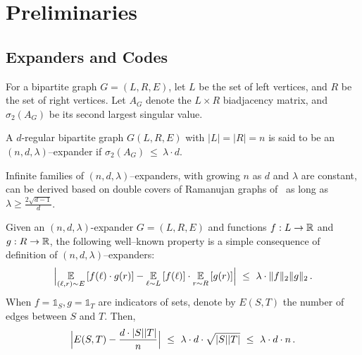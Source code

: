 \section{Preliminaries}\label{sec:prelims}


\subsection{Expanders and Codes}



%
%


For a bipartite graph $G=(L,R,E)$, let $L$ be the set of left vertices, and $R$ be the set of right vertices. Let $A_G$ denote the $L\times R$ biadjacency matrix, and $\sigma_2(A_G)$ be its second largest singular value.
 
 
\begin{definition}
A $d$-regular bipartite graph $G(L,R,E)$ with $|L|=|R|=n$ is said to be an $(n,d,\lambda)$--expander if $\sigma_2(A_G) ~\leq~ \lambda \cdot d$.
\end{definition}

Infinite families of $(n,d,\lambda)$--expanders, with growing $n$ as $d$ and $\lambda$ are constant, can be derived based on double covers of Ramanujan graphs of~\cite{LPS88} as long as $\lambda \geq \frac{2\sqrt{d-1}}{d}$.

\begin{lemma}\label{lem:eml}
	Given an $(n,d,\lambda)$-expander $G=(L,R,E)$ and functions $f: L \rightarrow {\mathbb R}$ and $g: R \rightarrow {\mathbb R}$, the following well--known property is a simple consequence of definition of $(n,d,\lambda)$--expanders:
	\[ \Big\vert{\Ex{(\li,\ri) \sim E}{ f(\li) \cdot g(\ri)} - \Ex{\li\sim L}{f(\li)} \cdot \Ex{\ri\sim R}{g(\ri)}}
                \Big\vert ~\leq~ \lambda \cdot \norm{f}_2\norm{g}_2 \mper
	\]
	When $f = \mathbb{1}_S,g = \mathbb{1}_T$ are indicators of sets, denote by $E(S,T)$ the number of edges between $S$ and $T$.  Then,
	\[ \Big\vert{ {E(S,T)} -\frac{d\cdot |S||T|}{n}}
                \Big\vert ~\leq~ \lambda \cdot d\cdot  \sqrt{|S||T|} ~\leq~ \lambda \cdot d\cdot n \,.
	\]	
\end{lemma}

